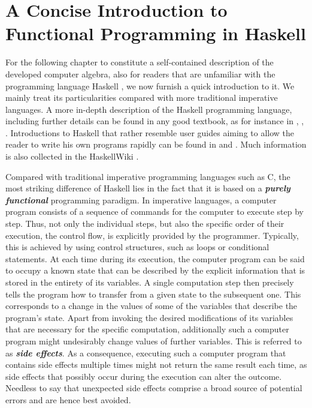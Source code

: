 
\section{A Concise Introduction to Functional Programming in Haskell}
For the following chapter to constitute a self-contained description of the developed computer algebra, also for readers that are unfamiliar with the programming language Haskell \cite{Marlow_haskell2010}, we now furnish a quick introduction to it. We mainly treat its particularities compared with more traditional imperative languages.
A more in-depth description of the Haskell programming language, including 
further details can be found in any good textbook, as for instance in \cite{Thompson99thecraft}, \cite{bird_2014}, \cite{hutton_2007}. Introductions to Haskell that rather resemble user guides aiming to allow the reader to write his own programs rapidly can be found in  \cite{OSullivan2008} and  \cite{Lipovaca:2011:LYH:2018642}. Much information is also collected in the HaskellWiki \cite{wiki:xxx}.

Compared with traditional imperative programming languages such as C, the most striking difference of Haskell lies in the fact that it is based on a \textbf{\textit{purely functional}} programming paradigm. In imperative languages, a computer program consists of a sequence of commands for the computer to execute step by step. Thus, not only the individual steps, but also the specific order of their execution, the control flow, is explicitly provided by the programmer. Typically, this is achieved by using control structures, such as loops or conditional statements. At each time during its execution, the computer program can be said to occupy a known state that can be described by the explicit information that is stored in the entirety of its variables. A single computation step then precisely tells the program how to transfer from a given state to the subsequent one. This corresponds to a change in the values of some of the variables that describe the program's state. Apart from invoking the desired modifications of its variables that are necessary for the specific computation, additionally such a computer program might undesirably change values of further variables. This is referred to as \textit{\textbf{side effects}}. As a consequence, executing such a computer program that contains side effects multiple times might not return the same result each time, as side effects that possibly occur during the execution can alter the outcome. Needless to say that unexpected side effects comprise a broad source of potential errors and are hence best avoided.

